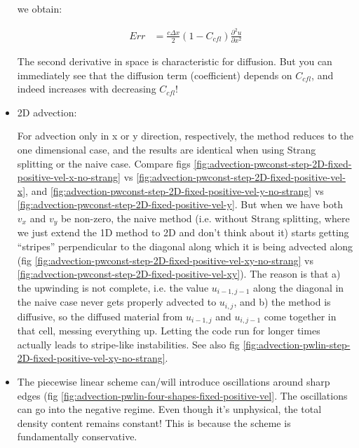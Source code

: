 \begin{itemize}
		we obtain:

		\begin{align}
			Err &= \frac{c\Delta x}{2} \left(1 - C_{cfl} \right) \frac{\partial^2 u }{\partial x^2} \label{eq:advection-diffusivity-error}
		\end{align}		
		
		
		The second derivative in space is characteristic for diffusion.
		But you can immediately see that the diffusion term (coefficient) depends on $C_{cfl}$, and indeed increases with decreasing $C_{cfl}$!
		
		
		
	\item 2D advection:
	

		For advection only in x or y direction, respectively, the method reduces to the one dimensional case, and the results are identical when using Strang splitting or the naive case.
		Compare figs \ref{fig:advection-pwconst-step-2D-fixed-positive-vel-x-no-strang} vs \ref{fig:advection-pwconst-step-2D-fixed-positive-vel-x}, and \ref{fig:advection-pwconst-step-2D-fixed-positive-vel-y-no-strang} vs \ref{fig:advection-pwconst-step-2D-fixed-positive-vel-y}.
		But when we have both $v_x$ and $v_y$ be non-zero, the naive method (i.e. without Strang splitting, where we just extend the 1D method to 2D and don't think about it) starts getting ``stripes'' perpendicular to the diagonal along which it is being advected along (fig \ref{fig:advection-pwconst-step-2D-fixed-positive-vel-xy-no-strang} vs \ref{fig:advection-pwconst-step-2D-fixed-positive-vel-xy}).
		The reason is that a) the upwinding is not complete, i.e. the value $u_{i-1, j-1}$ along the diagonal in the naive case never gets properly advected to $u_{i, j}$, and b) the method is diffusive, so the diffused material from $u_{i-1, j}$ and $u_{i, j-1}$ come together in that cell, messing everything up.
		Letting the code run for longer times actually leads to stripe-like instabilities. 
		See also fig \ref{fig:advection-pwlin-step-2D-fixed-positive-vel-xy-no-strang}.



			
		
		
		
		


    \item The piecewise linear scheme can/will introduce oscillations around sharp edges (fig \ref{fig:advection-pwlin-four-shapes-fixed-positive-vel}. 
            The oscillations can go into the negative regime. 
            Even though it's unphysical, the total density content remains constant!
            This is because the scheme is fundamentally conservative.
            

\end{itemize}
